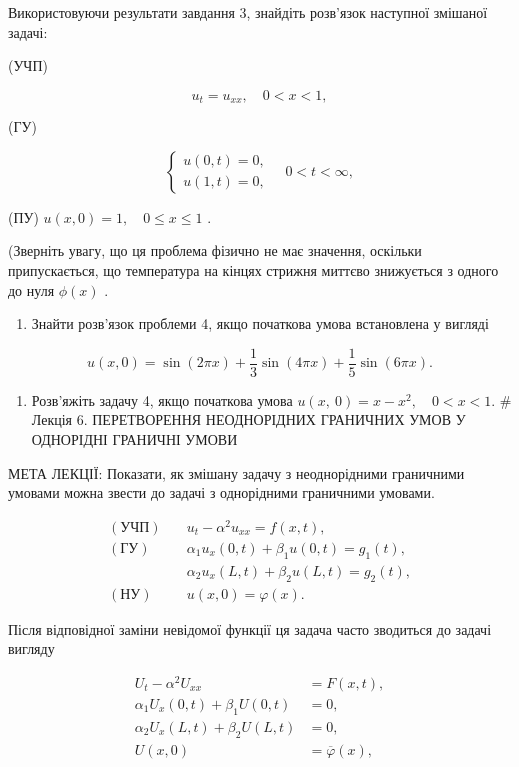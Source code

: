 \documentclass[
  ukrainian,
]{article}
\providecommand{\tightlist}{%
  \setlength{\itemsep}{0pt}\setlength{\parskip}{0pt}}
\begin{document}
Використовуючи результати завдання 3, знайдіть розв'язок наступної
змішаної задачі:

(УЧП)

\[
u_t = u_{xx}, \quad 0 < x < 1,
\]

(ГУ)

\[
\begin{cases}
u(0, t) = 0, \\
u(1, t) = 0,
\end{cases}
\quad 0 < t < \infty,
\]

(ПУ) \(u(x, 0) = 1, \quad 0 \le x \le 1\) .

(Зверніть увагу, що ця проблема фізично не має значення, оскільки
припускається, що температура на кінцях стрижня миттєво знижується з
одного до нуля \(\phi(x)\) .

\begin{enumerate}
\def\labelenumi{\arabic{enumi}.}
\setcounter{enumi}{4}
\tightlist
\item
  Знайти розв'язок проблеми 4, якщо початкова умова встановлена у
  вигляді
\end{enumerate}

\[
u(x, 0) = \sin(2\pi x) + \frac{1}{3}\sin(4\pi x) + \frac{1}{5}\sin(6\pi x).
\]

\begin{enumerate}
\def\labelenumi{\arabic{enumi}.}
\setcounter{enumi}{5}
\tightlist
\item
  Розв'яжіть задачу 4, якщо початкова умова
  \(u\left( x,\ 0\right) =x-x^{2},\quad 0< x<1.\) \# Лекція 6.
  ПЕРЕТВОРЕННЯ НЕОДНОРІДНИХ ГРАНИЧНИХ УМОВ У ОДНОРІДНІ ГРАНИЧНІ УМОВИ
\end{enumerate}

МЕТА ЛЕКЦІЇ: Показати, як змішану задачу з неоднорідними граничними
умовами можна звести до задачі з однорідними граничними умовами.

\[
\begin{aligned}
(\text{УЧП})\quad & u_t - \alpha^2 u_{xx} = f(x,t), \\
(\text{ГУ})\quad & \alpha_1 u_x(0,t) + \beta_1 u(0,t) = g_1(t), \\
& \alpha_2 u_x(L,t) + \beta_2 u(L,t) = g_2(t), \\
(\text{НУ})\quad & u(x,0) = \varphi(x).
\end{aligned}
\]

Після відповідної заміни невідомої функції ця задача часто зводиться до
задачі вигляду

\[
\begin{aligned}
U_t - \alpha^2 U_{xx} &= F(x,t), \\
\alpha_1 U_x(0,t) + \beta_1 U(0,t) &= 0, \\
\alpha_2 U_x(L,t) + \beta_2 U(L,t) &= 0, \\
U(x,0) &= \overline{\varphi}(x),
\end{aligned}
\]
\end{document}

